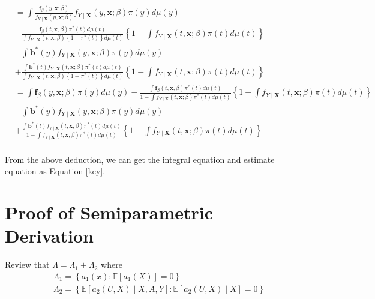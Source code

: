\documentclass[11pt]{article}
\begin{document}
$$\begin{aligned}
& =\int \frac{\mathbf{f}_\beta(y, \mathbf{x} ; \beta)}{f_{Y \mid \mathbf{X}}(y, \mathbf{x} ; \beta)} f_{Y \mid \mathbf{X}}(y, \mathbf{x} ; \beta) \pi(y) d \mu(y) \\
& -\frac{\mathbf{f}_\beta(t, \mathbf{x}, \beta) \pi^*(t) d \mu(t)}{\int f_{Y \mid \mathbf{X}}(t, \mathbf{x} ; \beta)\left\{1-\pi^*(t)\right\} d \mu(t)}\left\{1-\int f_{Y \mid \mathbf{X}}(t, \mathbf{x} ; \beta) \pi(t) d \mu(t)\right\} \\
& -\int \mathbf{b}^*(y) f_{Y \mid \mathbf{X}}(y, \mathbf{x} ; \beta) \pi(y) d \mu(y) \\
& +\frac{\int \mathbf{b}^*(t) f_{Y \mid \mathbf{X}}(t, \mathbf{x} ; \beta) \pi^*(t) d \mu(t)}{\int f_{Y \mid \mathbf{X}}(t, \mathbf{x} ; \beta)\left\{1-\pi^*(t)\right\} d \mu(t)}\left\{1-\int f_{Y \mid \mathbf{X}}(t, \mathbf{x} ; \beta) \pi(t) d \mu(t)\right\} \\
& =\int \mathbf{f}_\beta(y, \mathbf{x} ; \beta) \pi(y) d \mu(y)-\frac{\int \mathbf{f}_\beta(t, \mathbf{x}, \beta) \pi^*(t) d \mu(t)}{1-\int f_{Y \mid \mathbf{X}}(t, \mathbf{x} ; \beta) \pi^*(t) d \mu(t)}\left\{1-\int f_{Y \mid \mathbf{X}}(t, \mathbf{x} ; \beta) \pi(t) d \mu(t)\right\} \\
& -\int \mathbf{b}^*(y) f_{Y \mid \mathbf{X}}(y, \mathbf{x} ; \beta) \pi(y) d \mu(y) \\
& +\frac{\int \mathbf{b}^*(t) f_{Y \mid \mathbf{X}}(t, \mathbf{x} ; \beta) \pi^*(t) d \mu(t)}{1-\int f_{Y \mid \mathbf{X}}(t, \mathbf{x} ; \beta) \pi^*(t) d \mu(t)}\left\{1-\int f_{Y \mid \mathbf{X}}(t, \mathbf{x} ; \beta) \pi(t) d \mu(t)\right\} \\
&
\end{aligned}
$$

From the above deduction, we can get the integral equation and estimate equation as Equation \ref{key}.

\section{Proof of Semiparametric Derivation}
\label{semi_proof}

Review that $\Lambda=\Lambda_1+\Lambda_2$ where
$$
\begin{aligned}
& \Lambda_1=\left\{a_1(x): \mathbb{E}\left[a_1(X)\right]=0\right\} \\
& \Lambda_2=\left\{\mathbb{E}\left[a_2(U, X) \mid X, A, Y\right]: \mathbb{E}\left[a_2(U, X) \mid X\right]=0\right\}
\end{aligned}
$$
\end{document}
